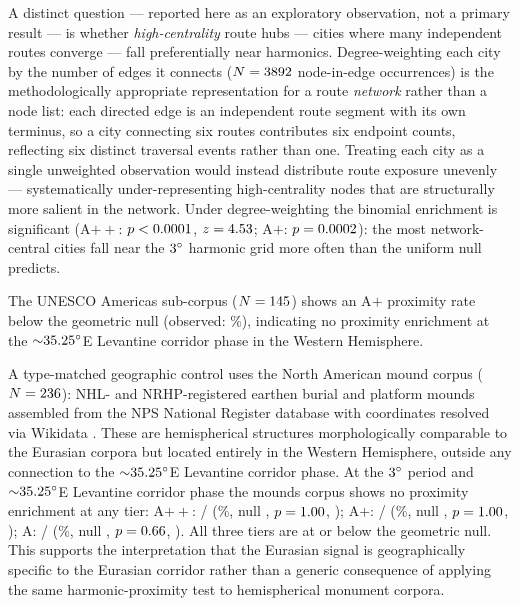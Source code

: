\documentclass[12pt,a4paper]{article}
\newcommand{\degr}{\ifmmode^\circ\else\textdegree{}\fi}
\begin{document}
A distinct question --- reported here as an exploratory observation, not a primary result --- is whether \emph{high-centrality} route hubs ---
cities where many independent routes converge --- fall preferentially
near harmonics. Degree-weighting each city by the number of edges it
connects ($N = 3892{}$ node-in-edge occurrences) is the
methodologically appropriate representation for a route \emph{network}
rather than a node list: each directed edge is an independent route
segment with its own terminus, so a city connecting six routes
contributes six endpoint counts, reflecting six distinct traversal
events rather than one. Treating each city as a single unweighted
observation would instead distribute route exposure unevenly ---
systematically under-representing high-centrality nodes that are
structurally more salient in the network. Under degree-weighting the
binomial enrichment is significant (A$++$:
$p < 0.0001{}$, $z = 4.53{}$;
A$+$: $p = 0.0002{}$): the most network-central cities fall
near the $3\degr$ harmonic grid more often than the uniform null
predicts.

The UNESCO Americas sub-corpus ($N = 145{}$) shows an A$+$
proximity rate below the \NullRateAp{} geometric null (observed: \AmericasApRate{}\%),
indicating no proximity enrichment at the ${\sim}35.25\degr$E Levantine corridor
phase in the Western Hemisphere.

A type-matched geographic control uses the North American mound corpus
($N = 236{}$): NHL- and NRHP-registered earthen burial and
platform mounds assembled from the NPS National Register database with
coordinates resolved via Wikidata \citep{nps2024nrhp,wikidata2024}.
These are hemispherical structures morphologically comparable to the
Eurasian corpora but located entirely in the Western Hemisphere,
outside any connection to the ${\sim}35.25\degr$E Levantine corridor
phase.
At the $3\degr$ period and ${\sim}35.25\degr$E Levantine corridor phase
the mounds corpus shows
no proximity enrichment at any tier:
A$++$: \moundsNApp{}/\moundsN{} (\moundsRateApp{}\%, null \NullRateApp{},
$p = 1.00{}$, \moundsPAppSig{});
A$+$: \moundsNAp{}/\moundsN{} (\moundsRateAp{}\%, null \NullRateAp{},
$p = 1.00{}$, \moundsPApSig{});
A: \moundsNA{}/\moundsN{} (\moundsRateA{}\%, null \NullRateA{},
$p = 0.66{}$, \moundsPASig{}).
All three tiers are at or below the geometric null.
This supports the interpretation that the Eurasian signal is
geographically specific to the Eurasian corridor rather than a generic
consequence of applying the same harmonic-proximity test to
hemispherical monument corpora.
\end{document}
